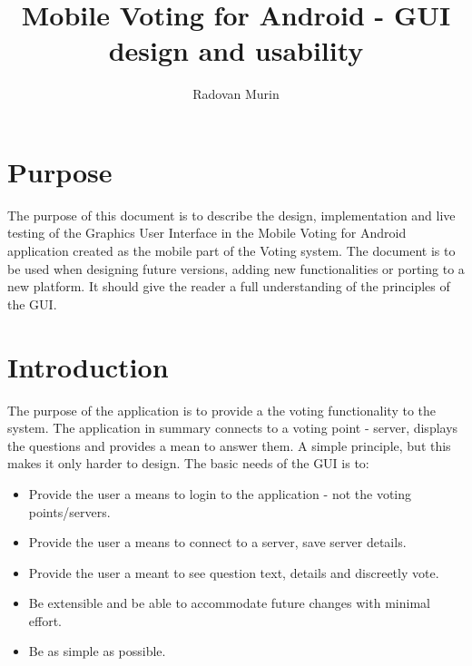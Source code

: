 \documentclass[11pt]{article} %
\title{Mobile Voting for Android - GUI design and usability}
\author{Radovan Murin}
\begin{document}
\maketitle

\section{Purpose}

The purpose of this document is to describe the design, implementation and live testing of the Graphics User Interface in the Mobile Voting for Android application created as the mobile part of the Voting system. The document is to be used when designing future versions, adding new functionalities or porting to a new platform. It should give the reader a full understanding of the principles of the GUI.

\section{Introduction}
The purpose of the application is to provide a the voting functionality to the system. The application in summary connects to a voting point - server, displays the questions and provides a mean to answer them. A simple principle, but this makes it only harder to design.
The basic needs of the GUI is to:
\begin{itemize}
\item Provide the user a means to login to the application - not the voting points/servers.
\item Provide the user a means to connect to a server, save server details.
\item Provide the user a meant to see question text, details and discreetly vote.
\item Be extensible and be able to accommodate future changes with minimal effort. 
\item Be as simple as possible.
\end{itemize}
\end{document}
